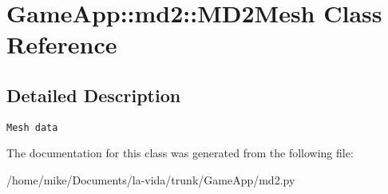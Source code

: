 \hypertarget{classGameApp_1_1md2_1_1MD2Mesh}{
\section{GameApp::md2::MD2Mesh Class Reference}
\label{classGameApp_1_1md2_1_1MD2Mesh}
}


\subsection{Detailed Description}


\footnotesize\begin{verbatim}Mesh data \end{verbatim}
\normalsize
 

The documentation for this class was generated from the following file:\begin{CompactItemize}
\item 
/home/mike/Documents/la-vida/trunk/GameApp/md2.py\end{CompactItemize}
